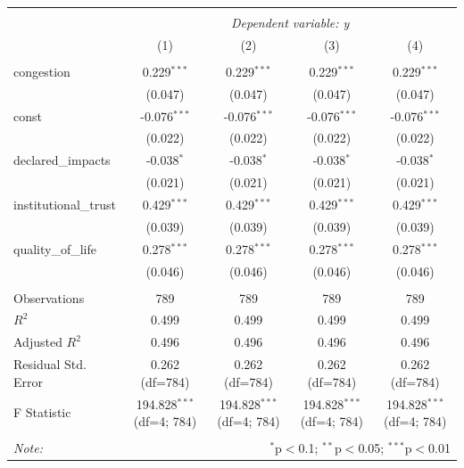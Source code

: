 \begin{table}[!htbp] \centering
\begin{tabular}{@{\extracolsep{5pt}}lcccc}
\\[-1.8ex]\hline
\hline \\[-1.8ex]
& \multicolumn{4}{c}{\textit{Dependent variable: y}} \
\cr \cline{2-5}
\\[-1.8ex] & (1) & (2) & (3) & (4) \\
\hline \\[-1.8ex]
 congestion & 0.229$^{***}$ & 0.229$^{***}$ & 0.229$^{***}$ & 0.229$^{***}$ \\
& (0.047) & (0.047) & (0.047) & (0.047) \\
 const & -0.076$^{***}$ & -0.076$^{***}$ & -0.076$^{***}$ & -0.076$^{***}$ \\
& (0.022) & (0.022) & (0.022) & (0.022) \\
 declared_impacts & -0.038$^{*}$ & -0.038$^{*}$ & -0.038$^{*}$ & -0.038$^{*}$ \\
& (0.021) & (0.021) & (0.021) & (0.021) \\
 institutional_trust & 0.429$^{***}$ & 0.429$^{***}$ & 0.429$^{***}$ & 0.429$^{***}$ \\
& (0.039) & (0.039) & (0.039) & (0.039) \\
 quality_of_life & 0.278$^{***}$ & 0.278$^{***}$ & 0.278$^{***}$ & 0.278$^{***}$ \\
& (0.046) & (0.046) & (0.046) & (0.046) \\
\hline \\[-1.8ex]
 Observations & 789 & 789 & 789 & 789 \\
 $R^2$ & 0.499 & 0.499 & 0.499 & 0.499 \\
 Adjusted $R^2$ & 0.496 & 0.496 & 0.496 & 0.496 \\
 Residual Std. Error & 0.262 (df=784) & 0.262 (df=784) & 0.262 (df=784) & 0.262 (df=784) \\
 F Statistic & 194.828$^{***}$ (df=4; 784) & 194.828$^{***}$ (df=4; 784) & 194.828$^{***}$ (df=4; 784) & 194.828$^{***}$ (df=4; 784) \\
\hline
\hline \\[-1.8ex]
\textit{Note:} & \multicolumn{4}{r}{$^{*}$p$<$0.1; $^{**}$p$<$0.05; $^{***}$p$<$0.01} \\
\end{tabular}
\end{table}